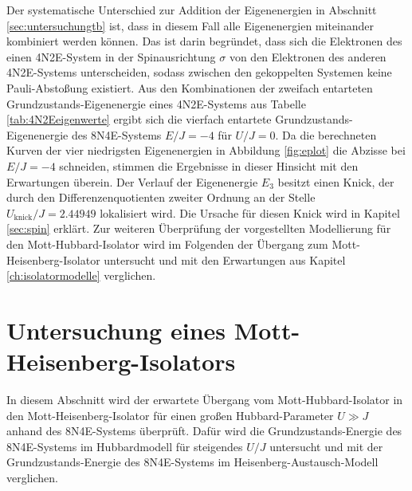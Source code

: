 Der systematische Unterschied zur Addition der Eigenenergien in Abschnitt \ref{sec:untersuchungtb} ist, dass in diesem Fall alle
Eigenenergien miteinander kombiniert werden können. Das ist darin begründet, dass sich die Elektronen des einen 4N2E-System in der Spinausrichtung $\sigma$ von
den Elektronen des anderen 4N2E-Systems unterscheiden, sodass zwischen den gekoppelten Systemen keine Pauli-Abstoßung existiert.
Aus den Kombinationen der zweifach entarteten Grundzustands-Eigenenergie eines 4N2E-Systems aus Tabelle \ref{tab:4N2Eeigenwerte} ergibt sich die vierfach entartete
Grundzustands-Eigenenergie des 8N4E-Systems $E/J = -4$ für $U/J = 0$. Da die berechneten Kurven der vier niedrigsten Eigenenergien in Abbildung \ref{fig:eplot} die Abzisse bei $E/J = -4$
schneiden, stimmen die Ergebnisse in dieser Hinsicht mit den Erwartungen überein.
Der Verlauf der Eigenenergie $E_3$ besitzt einen Knick, der durch den Differenzenquotienten zweiter Ordnung an der Stelle $U_\text{knick}/J = 2.44949$ lokalisiert wird.
Die Ursache für diesen Knick wird in Kapitel \ref{sec:spin} erklärt. Zur weiteren Überprüfung der vorgestellten Modellierung für den
Mott-Hubbard-Isolator wird im Folgenden der Übergang zum Mott-Heisenberg-Isolator untersucht und mit den Erwartungen aus Kapitel \ref{ch:isolatormodelle} verglichen.

\newpage

\section{Untersuchung eines Mott-Heisenberg-Isolators}
\label{sec:untersuchungheis}

In diesem Abschnitt wird der erwartete Übergang vom Mott-Hubbard-Isolator in den Mott-Heisenberg-Isolator für einen großen Hubbard-Parameter $U \gg J$ anhand des 8N4E-Systems überprüft.
Dafür wird die Grundzustands-Energie des 8N4E-Systems im Hubbardmodell für steigendes $U/J$ untersucht und mit der Grundzustands-Energie des 8N4E-Systems im Heisenberg-Austausch-Modell verglichen.

